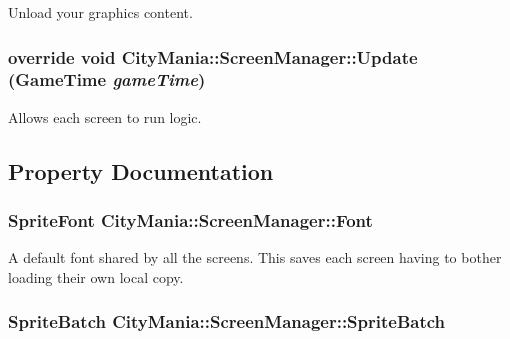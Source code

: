 Unload your graphics content. \hypertarget{classCityMania_1_1ScreenManager_a1be14955491964faa852cda75eb4da8d}{
\subsubsection[{Update}]{\setlength{\rightskip}{0pt plus 5cm}override void CityMania::ScreenManager::Update (GameTime {\em gameTime})}}
\label{classCityMania_1_1ScreenManager_a1be14955491964faa852cda75eb4da8d}


Allows each screen to run logic. 

\subsection{Property Documentation}
\hypertarget{classCityMania_1_1ScreenManager_af019d3ddc16fb36a2ad1106bf4081ef6}{
\subsubsection[{Font}]{\setlength{\rightskip}{0pt plus 5cm}SpriteFont CityMania::ScreenManager::Font}}
\label{classCityMania_1_1ScreenManager_af019d3ddc16fb36a2ad1106bf4081ef6}


A default font shared by all the screens. This saves each screen having to bother loading their own local copy. \hypertarget{classCityMania_1_1ScreenManager_aa3760417a620217307bfe78170a01330}{
\subsubsection[{SpriteBatch}]{\setlength{\rightskip}{0pt plus 5cm}SpriteBatch CityMania::ScreenManager::SpriteBatch}}
\label{classCityMania_1_1ScreenManager_aa3760417a620217307bfe78170a01330}


